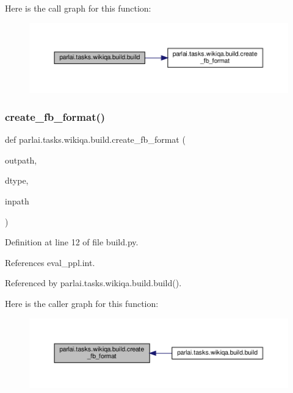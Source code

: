 Here is the call graph for this function\+:
\nopagebreak
\begin{figure}[H]
\begin{center}
\leavevmode
\includegraphics[width=350pt]{namespaceparlai_1_1tasks_1_1wikiqa_1_1build_a76f8aa9733d147ed1b5f2ec73a2bde07_cgraph}
\end{center}
\end{figure}
\mbox{\label{namespaceparlai_1_1tasks_1_1wikiqa_1_1build_a554828702769592403db58c955d1dfe3}} 
\subsubsection{\texorpdfstring{create\+\_\+fb\+\_\+format()}{create\_fb\_format()}}
{\footnotesize\ttfamily def parlai.\+tasks.\+wikiqa.\+build.\+create\+\_\+fb\+\_\+format (\begin{DoxyParamCaption}\item[{}]{outpath,  }\item[{}]{dtype,  }\item[{}]{inpath }\end{DoxyParamCaption})}



Definition at line 12 of file build.\+py.



References eval\+\_\+ppl.\+int.



Referenced by parlai.\+tasks.\+wikiqa.\+build.\+build().

Here is the caller graph for this function\+:
\nopagebreak
\begin{figure}[H]
\begin{center}
\leavevmode
\includegraphics[width=350pt]{namespaceparlai_1_1tasks_1_1wikiqa_1_1build_a554828702769592403db58c955d1dfe3_icgraph}
\end{center}
\end{figure}
